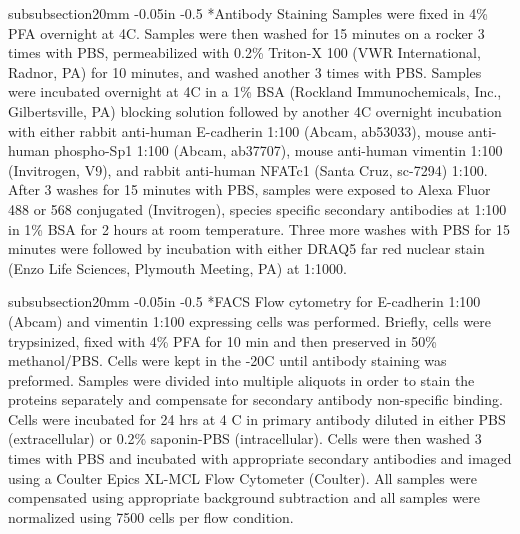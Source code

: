 \documentclass[12pt]{article}
\makeatletter
\renewcommand\subsubsection{\@startsection
	{subsubsection}{2}{0mm}
	{-0.05in}
	{-0.5\baselineskip}
	{\normalfont\normalsize\itshape}}
\makeatother
\begin{document}
\subsubsection*{Antibody Staining}
Samples were fixed in 4\% PFA overnight at 4C.   Samples were then washed for 15 minutes on a rocker 3 times with PBS, permeabilized with 0.2\% Triton-X 100 (VWR International, Radnor, PA) for 10 minutes, and washed another 3 times with PBS.  Samples were incubated overnight at 4C in a 1\% BSA (Rockland Immunochemicals, Inc., Gilbertsville, PA) blocking solution followed by another 4C overnight incubation with either rabbit anti-human E-cadherin 1:100 (Abcam, ab53033), mouse anti-human phospho-Sp1 1:100 (Abcam, ab37707), mouse anti-human vimentin 1:100  (Invitrogen, V9), and rabbit anti-human NFATc1 (Santa Cruz, sc-7294) 1:100.   After 3 washes for 15 minutes with PBS, samples were exposed to Alexa Fluor 488 or 568 conjugated (Invitrogen), species specific secondary antibodies at 1:100 in 1\% BSA for 2 hours at room temperature. Three more washes with PBS for 15 minutes were followed by incubation with either DRAQ5 far red nuclear stain (Enzo Life Sciences, Plymouth Meeting, PA) at 1:1000.

\subsubsection*{FACS}
Flow cytometry for E-cadherin 1:100 (Abcam) and vimentin 1:100 expressing cells was performed.  Briefly, cells were trypsinized, fixed with 4\% PFA for 10 min and then preserved in 50\% methanol/PBS.  Cells were kept in the -20C until antibody staining was preformed.   Samples were divided into multiple aliquots in order to stain the proteins separately and compensate for secondary antibody non-specific binding. Cells were incubated for 24 hrs at 4 C in primary antibody diluted in either PBS (extracellular) or 0.2\% saponin-PBS (intracellular). Cells were then washed 3 times with PBS and incubated with appropriate secondary antibodies and imaged using a Coulter Epics XL-MCL Flow Cytometer (Coulter).  All samples were compensated using appropriate background subtraction and all samples were normalized using 7500 cells per flow condition.
\end{document}
